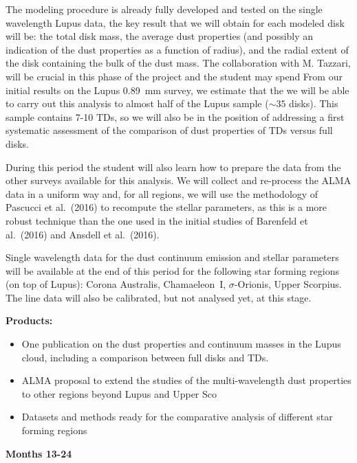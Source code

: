 \documentclass[10pt,fleqn,twoside]{article}
\begin{document}
The modeling procedure is already fully developed and tested on the single wavelength Lupus data, the key result that we will obtain for each modeled disk will be: the total disk mass, the average dust properties (and possibly an indication of the dust properties as a function of radius), and the radial extent of the disk containing the bulk of the dust mass. The collaboration with M. Tazzari, will be crucial in this phase of the project and the student may spend   From our initial results on the Lupus 0.89~mm survey, we estimate that the we will be able to carry out this analysis to almost half of the Lupus sample ($\sim 35$ disks). This sample contains 7-10 TDs, so we will also be in the position of addressing a first systematic assessment of the comparison of dust properties of TDs versus full disks.

During this period the student will also learn how to prepare the data from the other surveys available for this analysis. 
We will collect and re-process the ALMA data in a uniform way and, for all regions, we will use the methodology of Pascucci et al.~(2016) to recompute the stellar parameters, as this is a more robust 
technique than the one used in the initial studies of Barenfeld et al.~(2016) and Ansdell et al.~(2016).

Single wavelength data for the dust continuum emission and stellar parameters will be available at the end of this period for the following star forming regions (on top of Lupus): Corona Australis, Chamaeleon~I, $\sigma$-Orionis, Upper Scorpius. The line data will also be calibrated, but not analysed yet, at this stage. 

\smallskip
{\bf Products:} 
\begin{itemize}
\item One publication on the dust properties and continuum masses in the Lupus cloud, including a comparison between full disks and TDs.
\item ALMA proposal to extend the studies of the multi-wavelength dust properties to other regions beyond Lupus and Upper Sco
\item Datasets and methods ready for the comparative analysis of different star forming regions
\end{itemize}

{\Tcol\bf Months 13-24}\\
\end{document}
